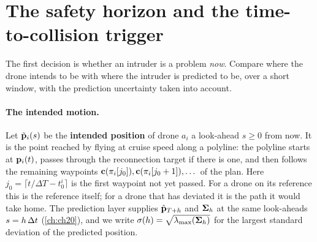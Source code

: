 \section[The safety horizon]{The safety horizon and the time-to-collision trigger}
\label{sec:ch24-horizon}

The first decision is whether an intruder is a problem \emph{now}. Compare
where the drone intends to be with where the intruder is predicted to be,
over a short window, with the prediction uncertainty taken into account.

\paragraph{The intended motion.}
Let $\tilde{\mathbf{p}}_i(s)$ be the \textbf{intended position} of drone $a_i$ a look-ahead $s \ge 0$ from now. It is the point
reached by flying at cruise speed along a polyline: the polyline starts at
$\mathbf{p}_i(t)$, passes through the reconnection target if there is one, and
then follows the remaining waypoints $\mathbf{c}(\pi_i[j_0]),
\mathbf{c}(\pi_i[j_0+1]), \dots$ of the plan. Here
$j_0 = \lceil t/\Delta T - t_0^i \rceil$ is the first waypoint
not yet passed. For a drone on its reference this is the reference itself;
for a drone that has deviated it is the path it would take home. The
prediction layer supplies $\hat{\mathbf{p}}_{T+h}$ and $\mathbf{\Sigma}_h$ at the
same look-aheads $s = h\,\Delta t$ (\cref{ch:ch20}), and we write
$\sigma(h) = \sqrt{\lambda_{\max}(\mathbf{\Sigma}_h)}$ for the largest
standard deviation of the predicted position.

